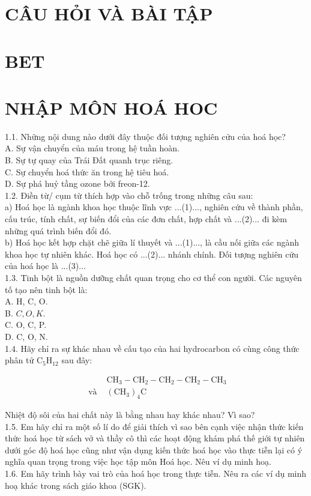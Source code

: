 \documentclass[10pt]{article}
\begin{document}
\captionsetup{singlelinecheck=false}
\section*{CÂU HỎI VÀ BÀI TẬP}
\section*{BET}
\section*{NHẬP MÔN HOÁ HOC}
1.1. Những nội dung nào dưới đây thuộc đối tượng nghiên cửu của hoá học?\\
A. Sự vận chuyển của máu trong hệ tuần hoàn.\\
B. Sự tự quay của Trái Đất quanh trục riêng.\\
C. Sự chuyển hoá thức ăn trong hệ tiêu hoá.\\
D. Sự phá huỷ tầng ozone bởi freon-12.\\
1.2. Điền từ/ cụm từ thích hợp vào chỗ trống trong những câu sau:\\
a) Hoá học là ngành khoa học thuộc lĩnh vực ...(1)..., nghiên cứu về thành phần, cấu trúc, tính chất, sự biến đổi của các đơn chất, hợp chất và ...(2)... đi kèm những quá trình biến đổi đó.\\
b) Hoá học kết hợp chặt chẽ giữa lí thuyết và ...(1)..., là cầu nối giữa các ngành khoa học tự nhiên khác. Hoá học có ...(2)... nhánh chính. Đối tượng nghiên cứu của hoá học là ...(3)...\\
1.3. Tinh bột là nguồn dưỡng chất quan trọng cho cơ thể con người. Các nguyên tố tạo nên tinh bột là:\\
A. H, C, O.\\
B. $C, O, K$.\\
C. O, C, P.\\
D. C, O, N.\\
1.4. Hãy chỉ ra sự khác nhau về cấu tạo của hai hydrocarbon có cùng công thức phân tử $\mathrm{C}_{5} \mathrm{H}_{12}$ sau đây:

\[
\begin{array}{ll} 
& \mathrm{CH}_{3}-\mathrm{CH}_{2}-\mathrm{CH}_{2}-\mathrm{CH}_{2}-\mathrm{CH}_{3} \\
\text { và } & \left(\mathrm{CH}_{3}\right)_{4} \mathrm{C} \tag{2}
\end{array}
\]

Nhiệt độ sôi của hai chất này là bằng nhau hay khác nhau? Vì sao?\\
1.5. Em hãy chỉ ra một số lí do để giải thích vì sao bên cạnh việc nhận thức kiến thức hoá học từ sách vở và thầy cô thì các hoạt động khám phá thế giới tự nhiên dưới góc độ hoá học cũng như vận dụng kiến thức hoá học vào thực tiễn lại có ý nghĩa quan trọng trong việc học tập môn Hoá học. Nêu ví dụ minh hoạ.\\
1.6. Em hãy trình bày vai trò của hoá học trong thực tiễn. Nêu ra các ví dụ minh hoạ khác trong sách giáo khoa (SGK).
\end{document}
